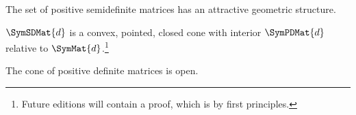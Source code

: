 

The set of positive semidefinite matrices has an attractive geometric structure.


\begin{proposition}
  $\SymSDMat{d}$ is a convex, pointed, closed cone with interior $\SymPDMat{d}$ relative to $\SymMat{d}$.\footnote{Future editions will contain a proof, which is by first principles.}
\end{proposition}

The cone of positive definite matrices is open.

\blankpage
